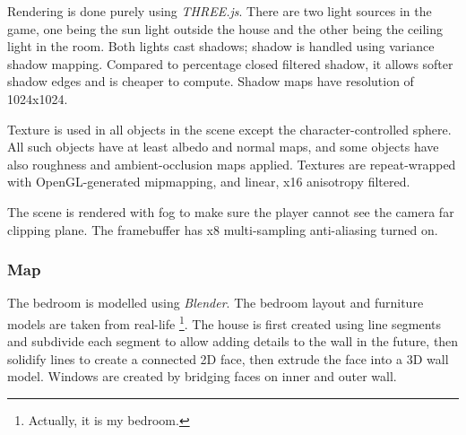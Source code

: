 \documentclass[12pt, a4paper, oneside]{article}
\begin{document}
    Rendering is done purely using \textit{THREE.js}. There are two light sources in the game, one being the sun light outside the house and the other being the ceiling light in the room. Both lights cast shadows; shadow is handled using variance shadow mapping. Compared to percentage closed filtered shadow, it allows softer shadow edges and is cheaper to compute. Shadow maps have resolution of 1024x1024.

    Texture is used in all objects in the scene except the character-controlled sphere. All such objects have at least albedo and normal maps, and some objects have also roughness and ambient-occlusion maps applied. Textures are repeat-wrapped with OpenGL-generated mipmapping, and linear, x16 anisotropy filtered.

    The scene is rendered with fog to make sure the player cannot see the camera far clipping plane. The framebuffer has x8 multi-sampling anti-aliasing turned on.

    \subsubsection{Map}

    The bedroom is modelled using \textit{Blender}. The bedroom layout and furniture models are taken from real-life \footnote{Actually, it is my bedroom.}. The house is first created using line segments and subdivide each segment to allow adding details to the wall in the future, then solidify lines to create a connected 2D face, then extrude the face into a 3D wall model. Windows are created by bridging faces on inner and outer wall.
\end{document}
